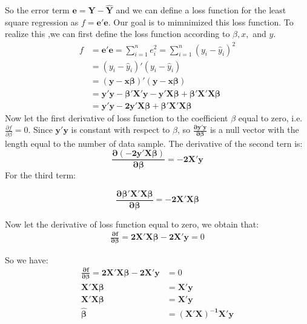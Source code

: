 So the error term $\bm{e=Y-\hat{Y}}$ and we can define a loss function for the least square regression as $f=\bm{e'e}$. Our goal is to mimnimized this loss function. To realize this ,we can first define the loss function according to $\beta,x,$ and $y$.
\begin{equation}
\begin{aligned}
f&=\bm{e'e}=\sum_{i=1}^{n}e_i^2=\sum_{i=1}^{n}(y_i-\hat{y}_i)^2\\
&=(y_i-\hat{y}_i)'(y_i-\hat{y}_i)\\
&=\bm{(y-\bm{x\beta})'(y-\bm{x\beta})}\\
&=\bm{y'y-\beta'X'y-y'X\beta+\beta'X'X\beta}\\
&=\bm{y'y-2y'X\beta+\beta'X'X\beta}
\end{aligned}
\end{equation} 
Now let the first derivative of loss function to the coefficient $\beta$ equal to zero, i.e. $\frac{\partial f}{\partial \beta}=0$. Since $\bm{y'y}$ is constant with respect to $\beta$, so $\bm{\frac{\partial y'y}{\partial \beta}}$ is a null vector with the length equal to the number of data sample. The derivative of the second tern is:\\
\begin{equation}
\bm{\frac{\partial (-2y'X\beta)}{\partial \beta}=-2X'y}
\end{equation}
For the third term:

\begin{equation}
\bm{\frac{\partial \beta'X'X\beta}{\partial \beta}=-2X'X\beta}
\end{equation}

Now let the derivative of loss function equal to zero, we obtain that:
\begin{equation}
\begin{aligned}
\bm{\frac{\partial f}{\partial \beta}=2X'X\beta-2X'y}=0
\end{aligned}
\end{equation}

So we have:
\begin{equation}
\begin{aligned}
\bm{\frac{\partial f}{\partial \beta}=2X'X\beta-2X'y}&=0\\
\bm{X'X\beta} &=\bm{X'y}\\
\bm{X'X\beta} &=\bm{X'y}\\
\bm{\hat{\beta} }&=\bm{(X'X)^{-1}X'y}
\end{aligned}
\end{equation}

